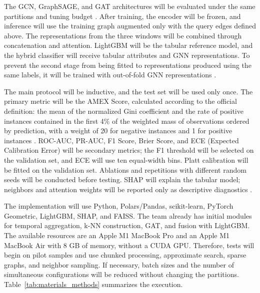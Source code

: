\documentclass[conference]{IEEEtran}
\begin{document}
The GCN, GraphSAGE, and GAT architectures will be evaluated under the same partitions and tuning budget \cite{sun2024applyinghybridgraphneural,SUN2025763,ZANDI2025586}. After training, the encoder will be frozen, and inference will use the training graph augmented only with the query edges defined above. The representations from the three windows will be combined through concatenation and attention. LightGBM will be the tabular reference model, and the hybrid classifier will receive tabular attributes and GNN representations. To prevent the second stage from being fitted to representations produced using the same labels, it will be trained with out-of-fold GNN representations \cite{zheng2022xgboostlightgbm,zhu2024localensemble,yang2026relationalgraphmodelingcredit}.

The main protocol will be inductive, and the test set will be used only once. The primary metric will be the AMEX Score, calculated according to the official definition: the mean of the normalized Gini coefficient and the rate of positive instances contained in the first 4\% of the weighted mass of observations ordered by prediction, with a weight of 20 for negative instances and 1 for positive instances \cite{amex-default-prediction}. ROC-AUC, PR-AUC, F1 Score, Brier Score, and ECE (Expected Calibration Error) will be secondary metrics; the F1 threshold will be selected on the validation set, and ECE will use ten equal-width bins. Platt calibration will be fitted on the validation set. Ablations and repetitions with different random seeds will be conducted before testing. SHAP will explain the tabular model; neighbors and attention weights will be reported only as descriptive diagnostics \cite{BITETTO2023101746,yang2025interpretable,yang2026relationalgraphmodelingcredit}.

The implementation will use Python, Polars/Pandas, scikit-learn, PyTorch Geometric, LightGBM, SHAP, and FAISS. The team already has initial modules for temporal aggregation, k-NN construction, GAT, and fusion with LightGBM. The available resources are an Apple M1 MacBook Pro and an Apple M1 MacBook Air with 8 GB of memory, without a CUDA GPU. Therefore, tests will begin on pilot samples and use chunked processing, approximate search, sparse graphs, and neighbor sampling. If necessary, batch sizes and the number of simultaneous configurations will be reduced without changing the partitions. Table~\ref{tab:materials_methods} summarizes the execution.
\end{document}

